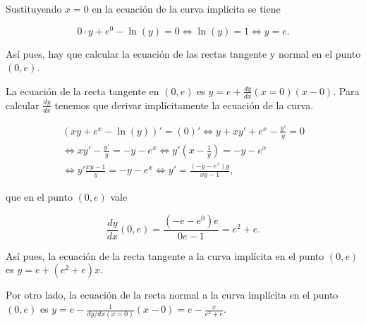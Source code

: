 \documentclass[
  spanish,
  a4paper,
]{scrreport}
\theoremstyle{definition}
\theoremstyle{remark}
\begin{document}
\begin{tcolorbox}[enhanced jigsaw, arc=.35mm, bottomrule=.15mm, bottomtitle=1mm, breakable, colback=white, colbacktitle=quarto-callout-tip-color!10!white, colframe=quarto-callout-tip-color-frame, coltitle=black, left=2mm, leftrule=.75mm, opacityback=0, opacitybacktitle=0.6, rightrule=.15mm, title=\textcolor{quarto-callout-tip-color}{\faLightbulb}\hspace{0.5em}{Solución}, titlerule=0mm, toprule=.15mm, toptitle=1mm]

Sustituyendo \(x=0\) en la ecuación de la curva implícita se tiene

\[
0\cdot y + e^0-\ln(y) = 0 \Leftrightarrow \ln(y) = 1 \Leftrightarrow y=e.
\]

Así pues, hay que calcular la ecuación de las rectas tangente y normal
en el punto \((0,e)\).

La ecuación de la recta tangente en \((0,e)\) es
\(y=e+\frac{dy}{dx}(x=0)(x-0)\). Para calcular \(\frac{dy}{dx}\) tenemos
que derivar implícitamente la ecuación de la curva.

\[
\begin{gathered}
(xy+e^x-\ln(y))'=(0)' \Leftrightarrow y+xy'+e^x-\frac{y'}{y} = 0 \\ 
\Leftrightarrow xy'-\frac{y'}{y} = -y-e^x \Leftrightarrow y'(x-\frac{1}{y}) = -y-e^x \\ 
\Leftrightarrow y'\frac{xy-1}{y}=-y-e^x \Leftrightarrow y' = \frac{(-y-e^x)y}{xy-1},
\end{gathered}
\]

que en el punto \((0,e)\) vale

\[
\frac{dy}{dx}(0,e) = \frac{(-e-e^0)e}{0e-1} = e^2+e.
\]

Así pues, la ecuación de la recta tangente a la curva implícita en el
punto \((0,e)\) es \(y = e+(e^2+e)x\).

Por otro lado, la ecuación de la recta normal a la curva implícita en el
punto \((0,e)\) es
\(y=e-\frac{1}{dy/dx (x=0)}(x-0) = e-\frac{x}{e^2+e}\).

\end{tcolorbox}
\end{document}

